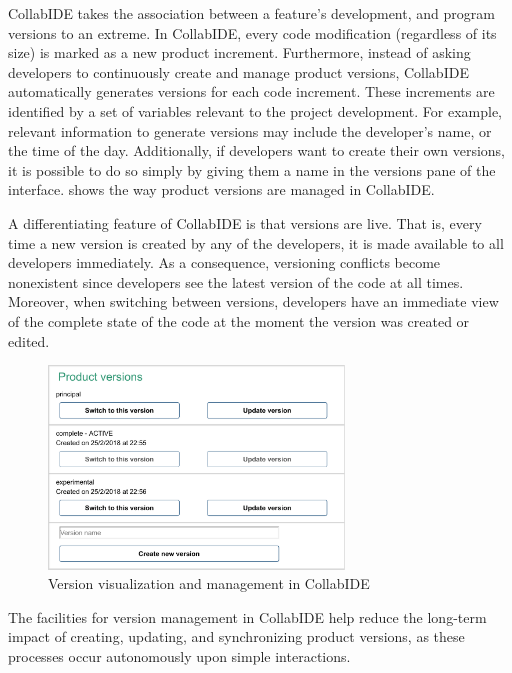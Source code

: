CollabIDE takes the association between a feature's development, and program versions to an 
extreme. In CollabIDE, every code modification (regardless of its size) is marked as a new product 
increment. Furthermore, instead of asking developers to continuously create and manage product 
versions, CollabIDE automatically generates versions for each code increment. These increments are 
identified by a set of variables relevant to the project development. For example, relevant information 
to generate versions may include the developer's name, or the time of the day. Additionally, if 
developers want to create their own versions, it is possible to do so simply by giving them a name in 
the versions pane of the interface.  shows the way product versions are 
managed in CollabIDE. 

A differentiating feature of CollabIDE is that versions are live. That is, every time a new version is 
created by any of the developers, it is made available to all developers immediately. 
As a consequence, versioning conflicts become nonexistent since developers see the latest 
version of the code at all times. Moreover, when switching between versions, developers have an 
immediate view of the complete state of the code at the moment the version was created or edited. 

\begin{figure}[tbp]
  \centering
  \includegraphics[width=0.7\textwidth]{img/fig4-collabIDEVersionManagement}
  \caption{Version visualization and management in CollabIDE}
  \label{fig:versions}
\end{figure}

The facilities for version management in CollabIDE help reduce the long-term impact of creating, 
updating, and synchronizing product versions, as these processes occur autonomously upon simple 
interactions.

